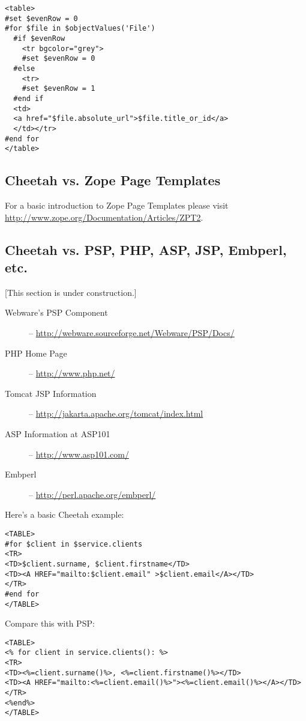 \begin{verbatim}
<table>
#set $evenRow = 0
#for $file in $objectValues('File')
  #if $evenRow
    <tr bgcolor="grey">
    #set $evenRow = 0
  #else
    <tr>
    #set $evenRow = 1
  #end if
  <td>
  <a href="$file.absolute_url">$file.title_or_id</a>
  </td></tr>
#end for
</table>
\end{verbatim}

\subsection{Cheetah vs. Zope Page Templates}
\label{comparisons.zpt}

For a basic introduction to Zope Page Templates please visit
\url{http://www.zope.org/Documentation/Articles/ZPT2}.

\subsection{Cheetah vs. PSP, PHP, ASP, JSP, Embperl, etc.}
\label{comparisons.pspEtc}

[This section is under construction.]

\begin{description}
\item[Webware's PSP Component] -- \url{http://webware.sourceforge.net/Webware/PSP/Docs/}
\item[PHP Home Page] -- \url{http://www.php.net/}
\item[Tomcat JSP Information] -- \url{http://jakarta.apache.org/tomcat/index.html}
\item[ASP Information at ASP101] -- \url{http://www.asp101.com/}
\item[Embperl] -- \url{http://perl.apache.org/embperl/}
\end{description}


Here's a basic Cheetah example:
\begin{verbatim}
<TABLE>
#for $client in $service.clients
<TR>
<TD>$client.surname, $client.firstname</TD>
<TD><A HREF="mailto:$client.email" >$client.email</A></TD>
</TR>
#end for
</TABLE>
\end{verbatim}

Compare this with PSP:

\begin{verbatim}
<TABLE>
<% for client in service.clients(): %>
<TR>
<TD><%=client.surname()%>, <%=client.firstname()%></TD>
<TD><A HREF="mailto:<%=client.email()%>"><%=client.email()%></A></TD>
</TR>
<%end%>
</TABLE>
\end{verbatim}


